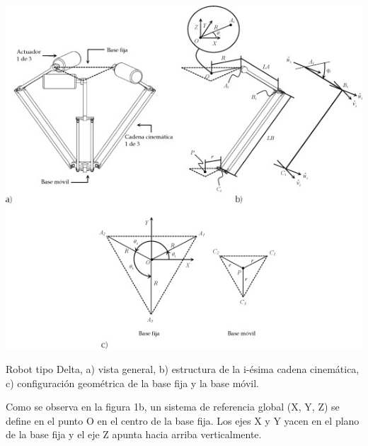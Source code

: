 \documentclass[a4paper,10pt]{article}
\begin{document}
\begin{center}
\includegraphics[width=\textwidth]{Imagen4.jpg}
\end{center}

Robot tipo Delta, a) vista general, b) estructura de la i-ésima cadena cinemática, c) configuración geométrica de la base fija y la base móvil.

Como se observa en la figura 1b, un sistema de referencia global (X, Y, Z) se define en el punto O en el centro de la base fija. Los ejes X y Y yacen en el plano de la base fija y el eje Z apunta hacia arriba verticalmente.
\end{document}
